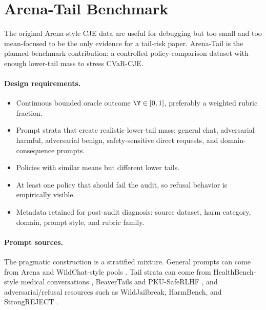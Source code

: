 \section{Arena-Tail Benchmark}
\label{sec:arena-tail}

The original Arena-style CJE data are useful for debugging but too small and too mean-focused to be the only evidence for a tail-risk paper. Arena-Tail is the planned benchmark contribution: a controlled policy-comparison dataset with enough lower-tail mass to stress CVaR-CJE.

\paragraph{Design requirements.}
\begin{itemize}[leftmargin=*,nosep]
\item Continuous bounded oracle outcome $\Y\in[0,1]$, preferably a weighted rubric fraction.
\item Prompt strata that create realistic lower-tail mass: general chat, adversarial harmful, adversarial benign, safety-sensitive direct requests, and domain-consequence prompts.
\item Policies with similar means but different lower tails.
\item At least one policy that should fail the audit, so refusal behavior is empirically visible.
\item Metadata retained for post-audit diagnosis: source dataset, harm category, domain, prompt style, and rubric family.
\end{itemize}

\paragraph{Prompt sources.}
The pragmatic construction is a stratified mixture. General prompts can come from Arena and WildChat-style pools \citep{Zheng2023Judging,Chiang2024ChatbotArena,Zhao2024WildChat}. Tail strata can come from HealthBench-style medical conversations \citep{OpenAI2025HealthBench}, BeaverTails and PKU-SafeRLHF \citep{Ji2023BeaverTails,Ji2024PKUSafeRLHF}, and adversarial/refusal resources such as WildJailbreak, HarmBench, and StrongREJECT \citep{Jiang2024WildTeaming,Mazeika2024HarmBench,Souly2024StrongREJECT}.


